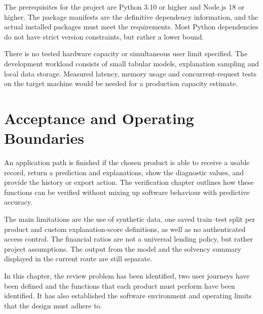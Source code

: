 The prerequisites for the project are Python 3.10 or higher and Node.js 18 or higher. The package manifests are the definitive dependency information, and the actual installed packages must meet the requirements. Most Python dependencies do not have strict version constraints, but rather a lower bound.

There is no tested hardware capacity or simultaneous user limit specified. The development workload consists of small tabular models, explanation sampling and local data storage. Measured latency, memory usage and concurrent-request tests on the target machine would be needed for a production capacity estimate.

\section{Acceptance and Operating Boundaries}
An application path is finished if the chosen product is able to receive a usable record, return a prediction and explanations, show the diagnostic values, and provide the history or export action. The verification chapter outlines how these functions can be verified without mixing up software behaviour with predictive accuracy.

The main limitations are the use of synthetic data, one saved train--test split per product and custom explanation-score definitions, as well as no authenticated access control. The financial ratios are not a universal lending policy, but rather project assumptions. The output from the model and the solvency summary displayed in the current route are still separate.

\par\medskip\noindent
In this chapter, the review problem has been identified, two user journeys have been defined and the functions that each product must perform have been identified. It has also established the software environment and operating limits that the design must adhere to.
